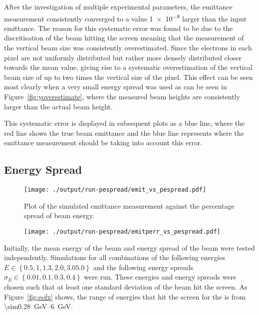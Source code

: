 After the investigation of multiple experimental parameters, the emittance
measurement consistently converged to a value \num{1e-8} larger than the input
emittance. The reason for this systematic error was found to be due to the
discritisation of the beam hitting the screen meaning that the measurement of
the vertical beam size was consistently overestimated. Since the electrons in
each pixel are not uniformly distributed but rather more densely distributed
closer towards the mean value, giving rise to a systematic overestimation of the
vertical beam size of up to two times the vertical size of the pixel. This
effect can be seen most clearly when a very small energy spread was used as can
be seen in Figure~\ref{fig:yoverestimate}, where the measured beam heights are
consistently larger than the actual beam height.

This systematic error is displayed in subsequent plots as a blue line, where the
red line shows the true beam emittance and the blue line represents where the
emittance measurement should be taking into account this error.

\subsection{Energy Spread}

\begin{figure}[!tb]
	\centering
	\texttt{[image: ./output/run-pespread/emit\_vs\_pespread.pdf]}
	\caption{
		Plot of the simulated emittance measurement against the percentage
		spread of beam energy.
	}
	\label{fig:emit_pespread}
\end{figure}

\begin{figure}[!tb]
	\centering
	\texttt{[image: ./output/run-pespread/emitperr\_vs\_pespread.pdf]}
	\caption{
	}
	\label{fig:emitperr_pespread}
\end{figure}


Initially, the mean energy of the beam and energy spread of the beam were tested
independently. Simulations for all combinations of the following energies \(E
\in \left\{ 0.5, 1, 1.3, 2.0, 3.0 5.0\right\} \) and the following energy
spreads \(\sigma_E \in \left\{ 0.01, 0.1, 0.3, 0.4 \right\}\) were run.  These
energies and energy spreads were chosen such that at least one standard
deviation of the beam hit the screen. As Figure~\ref{fig:eofx} shows, the range
of energies that hit the screen for the is from
\SIrange{\sim0.28}{6}{\giga\electronvolt}.


